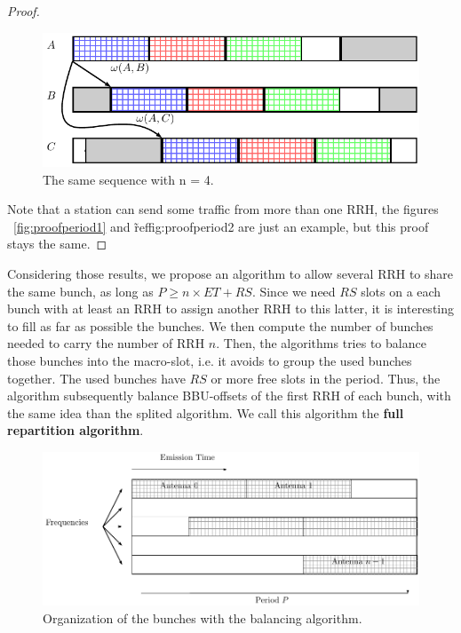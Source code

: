 \documentclass[]{algotel}
\begin{document}
\begin{proof}
   \begin{figure}[h]
\centering
      \includegraphics[scale=0.7]{period2.pdf}
     \caption{The same sequence with n = 4.}   \label{fig:proofperiod2}
  \end{figure}
  Note that a station can send some traffic from more than one RRH, the figures ~\ref{fig:proofperiod1} and \~ref{fig:proofperiod2} are just an example, but this proof stays the same.
 \end{proof}
 
Considering those results, we propose an algorithm to allow several RRH to share the same bunch, as long as $P \ge n\times ET + RS$. 
Since we need $RS$ slots on a each bunch with at least an RRH to assign another RRH to this latter, it is interesting to fill as far as possible the bunches. We then compute the number of bunches needed to carry the number of RRH $n$. Then, the algorithms tries to balance those bunches into the macro-slot, i.e. it avoids to group the used bunches together.
The used bunches have $RS$ or more free slots in the period. Thus, the algorithm subsequently balance BBU-offsets of the first RRH of each bunch, with the same idea than the splited algorithm. We call this algorithm the {\bf full repartition algorithm}. 

   \begin{figure}[h]
\centering
      \includegraphics[scale=0.7]{optimalgo.pdf}
     \caption{Organization of the bunches with the balancing algorithm.}   \label{fig:optimalgo}
  \end{figure}
  
\end{document}
